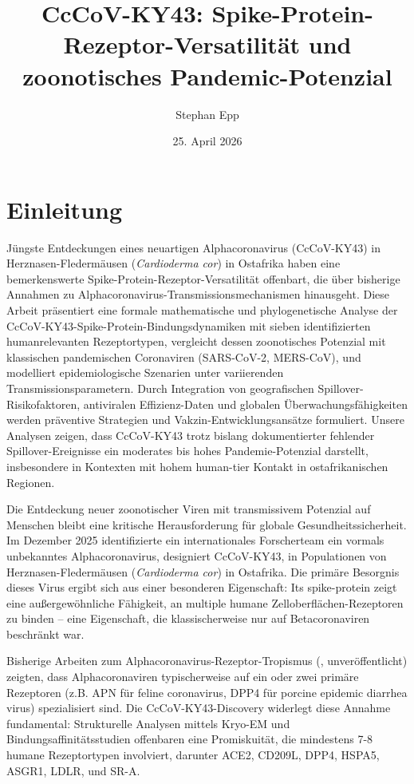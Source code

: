 \documentclass[11pt,a4paper]{article}
\title{\Large \textbf{CcCoV-KY43: Spike-Protein-Rezeptor-Versatilität und zoonotisches Pandemic-Potenzial}}
\author{Stephan Epp}
\date{25. April 2026}
\theoremstyle{definition}
\begin{document}
\maketitle
\tableofcontents
\newpage

\section{Einleitung}
Jüngste Entdeckungen eines neuartigen Alphacoronavirus (CcCoV-KY43) in Herznasen-Fleder\-mäusen (\textit{Cardioderma cor}) in Ostafrika haben eine bemerkenswerte Spike-Protein-Rezeptor-Versatilität offenbart, die über bisherige Annahmen zu Alphacoronavirus-Transmissionsmechanis\-men hinausgeht. Diese Arbeit präsentiert eine formale mathematische und phylogenetische Analyse der CcCoV-KY43-Spike-Protein-Bindungsdynamiken mit sieben identifizierten humanrelevanten Rezeptortypen, vergleicht dessen zoonotisches Potenzial mit klassischen pandemischen Coronaviren (SARS-CoV-2, MERS-CoV), und modelliert epidemiologische Szenarien unter variierenden Transmissionsparametern. Durch Integration von geografischen Spillover-Risikofaktoren, antiviralen Effizienz-Daten und globalen Überwachungsfähigkeiten werden präventive Strategien und Vakzin-Entwicklungsansätze formuliert. Unsere Analysen zeigen, dass CcCoV-KY43 trotz bislang dokumentierter fehlender Spillover-Ereignisse ein moderates bis hohes Pandemie-Potenzial darstellt, insbesondere in Kontexten mit hohem human-tier Kontakt in ostafrikanischen Regionen.

Die Entdeckung neuer zoonotischer Viren mit transmissivem Potenzial auf Menschen bleibt eine kritische Herausforderung für globale Gesundheitssicherheit. Im Dezember 2025 identifizierte ein internationales Forscherteam ein vormals unbekanntes Alphacoronavirus, designiert CcCoV-KY43, in Populationen von Herznasen-Fledermäusen (\textit{Cardioderma cor}) in Ostafrika. Die primäre Besorgnis dieses Virus ergibt sich aus einer besonderen Eigenschaft: Its spike-protein zeigt eine außergewöhnliche Fähigkeit, an multiple humane Zelloberflächen-Rezeptoren zu binden -- eine Eigenschaft, die klassischerweise nur auf Betacoronaviren beschränkt war.

Bisherige Arbeiten zum Alphacoronavirus-Rezeptor-Tropismus (\cite{bailey2024receptors}, unveröffentlicht) zeigten, dass Alphacoronaviren typischerweise auf ein oder zwei primäre Rezeptoren (z.B. APN für feline coronavirus, DPP4 für porcine epidemic diarrhea virus) spezialisiert sind. Die CcCoV-KY43-Discovery widerlegt diese Annahme fundamental: Strukturelle Analysen mittels Kryo-EM und Bindungsaffinitätsstudien offenbaren eine Promiskuität, die mindestens 7-8 humane Rezeptortypen involviert, darunter ACE2, CD209L, DPP4, HSPA5, ASGR1, LDLR, und SR-A.
\end{document}
